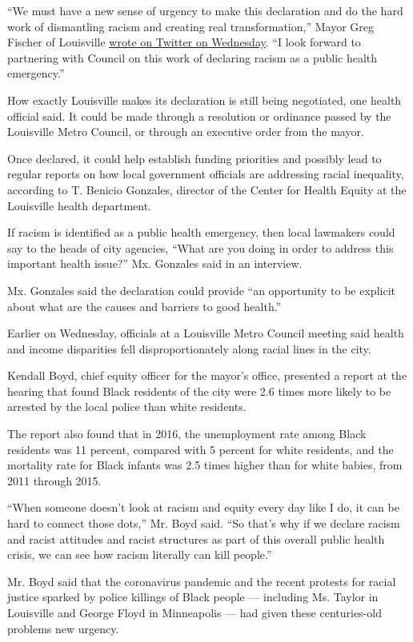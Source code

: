 ``We must have a new sense of urgency to make this declaration and do
the hard work of dismantling racism and creating real transformation,''
Mayor Greg Fischer of Louisville
\href{https://twitter.com/louisvillemayor/status/1288602379408084994}{wrote
on Twitter on Wednesday}. ``I look forward to partnering with Council on
this work of declaring racism as a public health emergency.''

How exactly Louisville makes its declaration is still being negotiated,
one health official said. It could be made through a resolution or
ordinance passed by the Louisville Metro Council, or through an
executive order from the mayor.

Once declared, it could help establish funding priorities and possibly
lead to regular reports on how local government officials are addressing
racial inequality, according to T. Benicio Gonzales, director of the
Center for Health Equity at the Louisville health department.

If racism is identified as a public health emergency, then local
lawmakers could say to the heads of city agencies, ``What are you doing
in order to address this important health issue?'' Mx. Gonzales said in
an interview.

Mx. Gonzales said the declaration could provide ``an opportunity to be
explicit about what are the causes and barriers to good health.''

Earlier on Wednesday, officials at a Louisville Metro Council meeting
said health and income disparities fell disproportionately along racial
lines in the city.

Kendall Boyd, chief equity officer for the mayor's office, presented a
report at the hearing that found Black residents of the city were 2.6
times more likely to be arrested by the local police than white
residents.

The report also found that in 2016, the unemployment rate among Black
residents was 11 percent, compared with 5 percent for white residents,
and the mortality rate for Black infants was 2.5 times higher than for
white babies, from 2011 through 2015.

``When someone doesn't look at racism and equity every day like I do, it
can be hard to connect those dots,'' Mr. Boyd said. ``So that's why if
we declare racism and racist attitudes and racist structures as part of
this overall public health crisis, we can see how racism literally can
kill people.''

Mr. Boyd said that the coronavirus pandemic and the recent protests for
racial justice sparked by police killings of Black people --- including
Ms. Taylor in Louisville and George Floyd in Minneapolis --- had given
these centuries-old problems new urgency.

